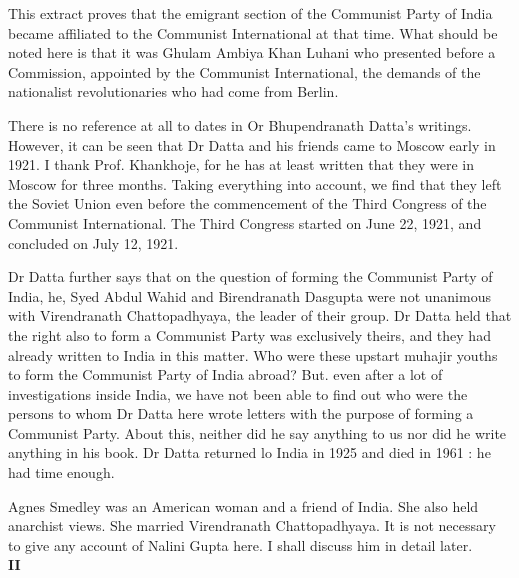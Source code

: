 This extract proves that the emigrant section of the Communist Party of India became affiliated to the Communist International at that time. What should be noted here is that it was Ghulam Ambiya Khan Luhani who presented before a Commission, appointed by the Communist International, the demands of the nationalist revolutionaries who had come from Berlin. 

There is no reference at all to dates in Or Bhupendranath Datta’s writings. However, it can be seen that Dr Datta and his friends came to Moscow early in 1921. I thank Prof. Khankhoje, for he has at least written that they were in Moscow for three months. Taking everything into account, we find that they left the Soviet Union even before the commencement of the Third Congress of the Communist International. The Third Congress started on June 22, 1921, and concluded on July 12, 1921. 

Dr Datta further says that on the question of forming the Communist Party of India, he, Syed Abdul Wahid and Birendranath Dasgupta were not unanimous with Virendranath Chattopadhyaya, the leader of their group. Dr Datta held that the right also to form a Communist Party was exclusively theirs, and they had already written to India in this matter. Who were these upstart muhajir youths to form the Communist Party of India abroad? But. even after a lot of investigations inside India, we have not been able to find out who were the persons to whom Dr Datta here wrote letters with the purpose of forming a Communist Party. About this, neither did he say anything to us nor did he write anything in his book. Dr Datta returned lo India in 1925 and died in 1961 : he had time enough.

Agnes Smedley was an American woman and a friend of India. She also held anarchist views. She married Virendranath Chattopadhyaya. It is not necessary to give any account of Nalini Gupta here. I shall discuss him in detail later.\\

{\textbf{II}}\\

